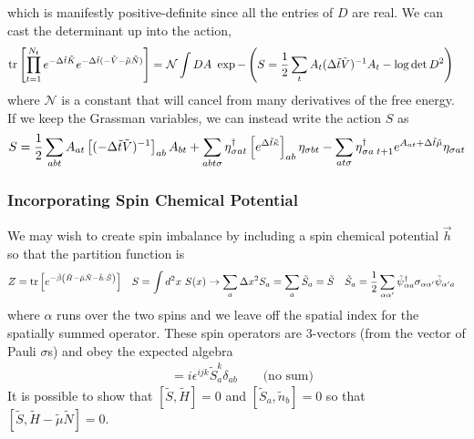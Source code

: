 which is manifestly positive-definite since all the entries of $D$ are real.
We can cast the determinant up into the action,
\begin{align}
	\text{tr}\left[ \prod_{t=1}^{N_t} e^{-\Delta \tilde{t}\tilde{K}}  e^{-\Delta \tilde{t} (-\tilde{V} - \tilde{\mu}\tilde{N})}  \right]
	=&
	~\mathcal{N}
	\int DA ~ \exp -\left(S = \frac{1}{2} \sum_t A_t (\Delta\tilde{t}\tilde{V})^{-1} A_t - \log \det D^2 \right)
\end{align}
where $\mathcal{N}$ is a constant that will cancel from many derivatives of the free energy.
If we keep the Grassman variables, we can instead write the action $S$ as
\begin{align}
	S = 
	\frac{1}{2} \sum_{ab t} A_{at} \left[(-\Delta\tilde{t} \tilde{V})^{-1}\right]_{ab} A_{bt}
+	\sum_{ab t \sigma} \eta{}^{\dagger}_{\sigma a t} \left[ e^{\Delta\tilde{t}\tilde{\kappa}}\right]_{ab} \eta_{\sigma b t}
-	\sum_{a t \sigma}\eta{}^{\dagger}_{\sigma a\; t+1} e^{A_{at} + \Delta \tilde{t} \tilde{\mu}} \eta_{\sigma a t}
\end{align}

\subsubsection{Incorporating Spin Chemical Potential}

We may wish to create spin imbalance by including a spin chemical potential $\vec{h}$ so that the partition function is
\begin{align}
	Z &= \text{tr}\left[e^{-\tilde{\beta}\left(\tilde{H} - \tilde{\mu}\tilde{N} - \tilde{h}\cdot\tilde{S}\right)} \right]
	&
	S &= \int d^2x~ S(x) \rightarrow \sum_a \Delta x^2 S_a = \sum_a \tilde{S}_a = \tilde{S}
	&
	\tilde{S}_a &= \frac{1}{2} \sum_{\alpha \alpha'} \tilde{\psi}{}^{\dagger}_{\alpha a} \sigma_{\alpha \alpha'} \tilde{\psi}_{\alpha' a}
\end{align}
where $\alpha$ runs over the two spins and we leave off the spatial index for the spatially summed operator.
These spin operators are 3-vectors (from the vector of Pauli $\sigma$s) and obey the expected algebra
\begin{align}
	[\tilde{S}_a^i, \tilde{S}_b^j] &= i \epsilon^{ijk} \tilde{S}^k_a \delta_{ab} \qquad\text{(no sum)}
\end{align}
It is possible to show that $[\tilde{S}, \tilde{H}] = 0$ and $[\tilde{S}_a, \tilde{n}_b] = 0$ so that $[\tilde{S}, \tilde{H} - \tilde{\mu}\tilde{N}] = 0$.

